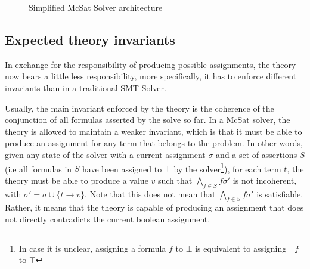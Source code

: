 \begin{figure}
  \begin{center}
  \end{center}
  \caption{Simplified McSat Solver architecture}\label{fig:mcsat_flow}
\end{figure}

\subsection{Expected theory invariants}

In exchange for the responsibility of producing possible assignments,
the theory now bears a little less responsibility, more specifically,
it has to enforce different invariants than in a traditional SMT Solver.

Usually, the main invariant enforced by the theory is the coherence of
the conjunction of all formulas asserted by the solve so far.
In a McSat solver, the theory is allowed to maintain a weaker invariant,
which is that it must be able to produce an assignment for any term
that belongs to the problem. In other words, given any state of the solver
with a current assignment $\sigma$ and a set of assertions $S$ (i.e all
formulas in $S$ have been assigned to $\top$ by the solver\footnote{In case it is
unclear, assigning a formula $f$ to $\bot$ is equivalent to assigning  $\neg f$ to $\top$}),
for each term $t$, the theory must be able to produce a value $v$
such that $\bigwedge_{f \in S} f\sigma'$ is not incoherent, with
$\sigma' = \sigma \cup \{ t \rightarrow v \}$. Note that this does not
mean that $\bigwedge_{f\in S} f\sigma'$ is satisfiable. Rather, it means that
the theory is capable of producing an assignment that does not directly
contradicts the current boolean assignment.


